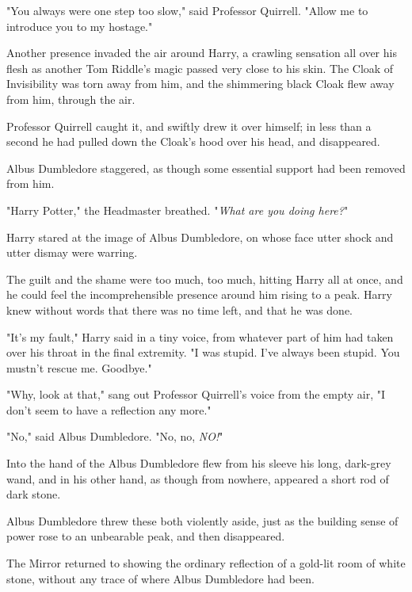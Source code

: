 "You always were one step too slow," said Professor Quirrell. "Allow me to
introduce you to my hostage."

Another presence invaded the air around Harry, a crawling sensation all over
his flesh as another Tom Riddle’s magic passed very close to his skin. The
Cloak of Invisibility was torn away from him, and the shimmering black Cloak
flew away from him, through the air.

Professor Quirrell caught it, and swiftly drew it over himself; in less than a
second he had pulled down the Cloak’s hood over his head, and disappeared.

Albus Dumbledore staggered, as though some essential support had been removed
from him.

"Harry Potter," the Headmaster breathed. "\emph{What are you doing here?}"

Harry stared at the image of Albus Dumbledore, on whose face utter shock and
utter dismay were warring.

The guilt and the shame were too much, too much, hitting Harry all at once, and
he could feel the incomprehensible presence around him rising to a peak. Harry
knew without words that there was no time left, and that he was done.

"It’s my fault," Harry said in a tiny voice, from whatever part of him had
taken over his throat in the final extremity. "I was stupid. I’ve always been
stupid. You mustn’t rescue me. Goodbye."

"Why, look at that," sang out Professor Quirrell’s voice from the empty air, "I
don’t seem to have a reflection any more."

"No," said Albus Dumbledore. "No, no, \emph{NO!}"

Into the hand of the Albus Dumbledore flew from his sleeve his long, dark-grey
wand, and in his other hand, as though from nowhere, appeared a short rod of
dark stone.

Albus Dumbledore threw these both violently aside, just as the building sense
of power rose to an unbearable peak, and then disappeared.

The Mirror returned to showing the ordinary reflection of a gold-lit room of
white stone, without any trace of where Albus Dumbledore had been.
